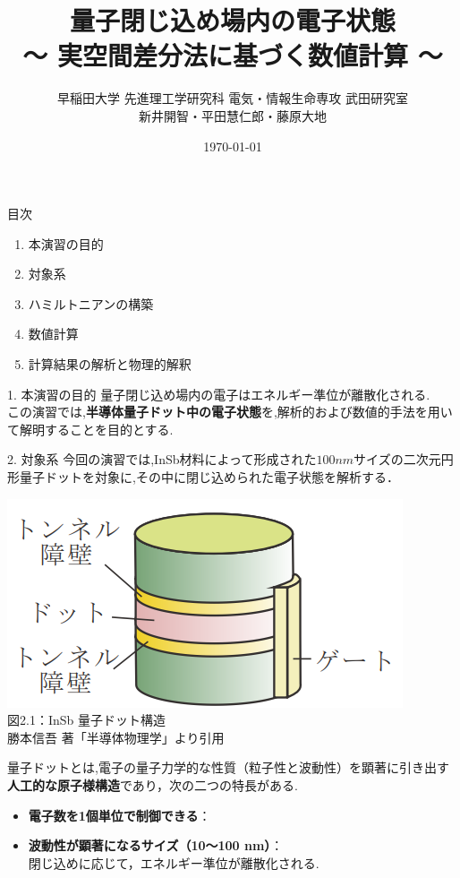 \documentclass{beamer}
\title{量子閉じ込め場内の電子状態\\\small ～ 実空間差分法に基づく数値計算 ～}
\author{早稲田大学 先進理工学研究科 電気・情報生命専攻 武田研究室\\新井開智・平田慧仁郎・藤原大地}
\date{\today}
\begin{document}
\frame{\titlepage}

\begin{frame}{目次}
\begin{enumerate}
  \item 本演習の目的
  \item 対象系
  \item ハミルトニアンの構築
  \item 数値計算
  \item 計算結果の解析と物理的解釈
\end{enumerate}
\end{frame}

\begin{frame}{1. 本演習の目的}
量子閉じ込め場内の電子はエネルギー準位が離散化される.\\
  この演習では,\textbf{半導体量子ドット中の電子状態}を,解析的および数値的手法を用いて解明することを目的とする.

\end{frame}



\begin{frame}{2. 対象系}
今回の演習では,InSb材料によって形成された$100nm$サイズの二次元円形量子ドットを対象に,その中に閉じ込められた電子状態を解析する．
\begin{center}
  \includegraphics[width=0.5\linewidth]{images/ドット.png} \\
  図2.1：InSb 量子ドット構造 \\
  \vspace{0.5em}
  {\tiny 勝本信吾 著「半導体物理学」より引用}
\end{center}


量子ドットとは,電子の量子力学的な性質（粒子性と波動性）を顕著に引き出す\textbf{人工的な原子様構造}であり，次の二つの特長がある.
\begin{itemize}
  \item \textbf{電子数を1個単位で制御できる}：  \\
  \item \textbf{波動性が顕著になるサイズ（10〜100 nm）}：  \\
  \rightarrow 閉じ込めに応じて，エネルギー準位が離散化される.
\end{itemize}




\end{frame}
\end{document}
